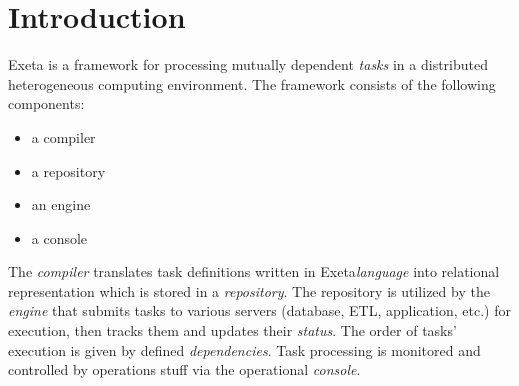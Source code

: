 \documentclass[a4paper,12pt,english,oneside]{book}
\title{\exeta}
\author{Martin Proch\'{a}zka}
\newcommand{\exeta}{Exeta\xspace}
\begin{document}
\newsavebox{\verbbox}

\maketitle

\tableofcontents

\chapter{Introduction}

\exeta is a framework for processing mutually dependent \emph{tasks} in a distributed heterogeneous computing environment. The framework consists of the following components:
\begin{itemize}
  \item a compiler
  \item a repository
  \item an engine
  \item a console
\end{itemize}
The \emph{compiler} translates task definitions written in \exeta \emph{language} into relational representation which is stored in a \emph{repository}. The repository is utilized by the \emph{engine} that submits tasks to various servers (database, ETL, application, etc.) for execution, then tracks them and updates their \emph{status}. The order of tasks' execution is given by defined \emph{dependencies}. Task processing is monitored and controlled by operations stuff via the operational \emph{console}. %
\end{document}
